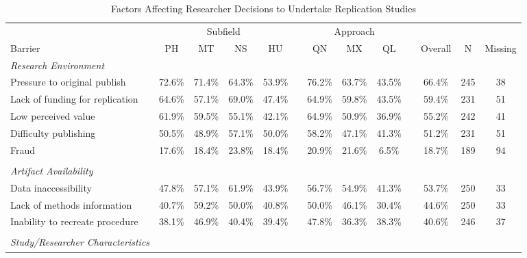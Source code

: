 \documentclass[]{interact}
\theoremstyle{plain}%
\theoremstyle{definition}
\theoremstyle{remark}
\begin{document}
\newpage
\begin{landscape}
\begin{table}[h]
    \centering
    \begin{threeparttable}
    \caption{Factors Affecting Researcher Decisions to Undertake Replication Studies }
    \begin{tabular}{l c c c c c c c c c c c c}
         \hline
                    & \multicolumn{4}{1}{Subfield}  & & \multicolumn{3}{1}{Approach} & & & & \\
         Barrier    & PH & MT & NS & HU            & & QN & MX & QL              & & Overall & N & Missing\\
         \hline
         \textit{Research Environment}      & & & & & & & & & & \\
         Pressure to original publish       & 72.6\% & 71.4\% & 64.3\% & 53.9\% & & 76.2\% & 63.7\% & 43.5\% & & 66.4\% & 245 & 38 \\
         Lack of funding for replication    & 64.6\% & 57.1\% & 69.0\% & 47.4\% & & 64.9\% & 59.8\% & 43.5\% & & 59.4\% & 231 & 51 \\
         Low perceived value                & 61.9\% & 59.5\% & 55.1\% & 42.1\% & & 64.9\% & 50.9\% & 36.9\% & & 55.2\% & 242 & 41 \\
         Difficulty publishing              & 50.5\% & 48.9\% & 57.1\% & 50.0\% & & 58.2\% & 47.1\% & 41.3\% & & 51.2\% & 231 & 51 \\
         Fraud                              & 17.6\% & 18.4\% & 23.8\% & 18.4\% & & 20.9\% & 21.6\% & 6.5\%  & & 18.7\% & 189 & 94 \\
                                            & & & & & & & & & & & & \\
         \textit{Artifact Availability}     & & & & & & & & & & & & \\
         Data inaccessibility               & 47.8\% & 57.1\% & 61.9\% & 43.9\% & & 56.7\% & 54.9\% & 41.3\% & & 53.7\% & 250 & 33 \\
         Lack of methods information        & 40.7\% & 59.2\% & 50.0\% & 40.8\% & & 50.0\% & 46.1\% & 30.4\% & & 44.6\% & 250 & 33 \\
         Inability to recreate procedure    & 38.1\% & 46.9\% & 40.4\% & 39.4\% & & 47.8\% & 36.3\% & 38.3\% & & 40.6\% & 246 & 37 \\
                                            & & & & & & & & & & & & \\
         \textit{Study/Researcher Characteristics}     & & & & & & & & & & & & \\

\end{tabular}
\end{threeparttable}
\end{table}
\end{landscape}
\end{document}
